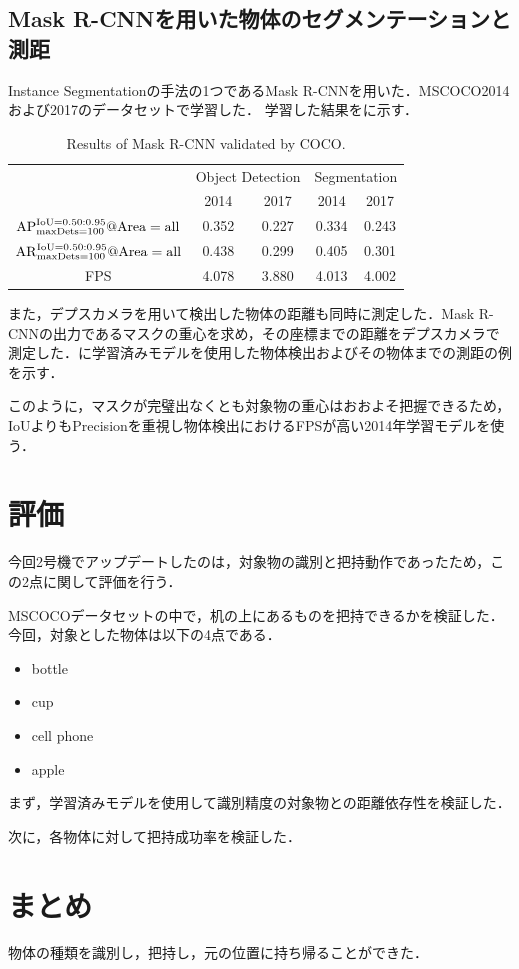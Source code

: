 \subsection{Mask R-CNNを用いた物体のセグメンテーションと測距}
Instance Segmentationの手法の1つであるMask R-CNNを用いた．MSCOCO2014および2017のデータセットで学習した．
学習した結果をに示す．

\begin{table}[H]
    \centering
    \caption{Results of Mask R-CNN validated by COCO.}
    \begin{tabular}{ccccc}\toprule
        & \multicolumn{2}{c}{Object Detection} & \multicolumn{2}{c}{Segmentation} \\ 
         & 2014 & 2017 & 2014 & 2017 \\ \midrule
        $\rm{AP}^{\rm{IoU}=0.50:0.95} _{\rm maxDets=100} @Area=all$ & 0.352 & 0.227 & 0.334 & 0.243 \\ 
        $\rm{AR}^{\rm{IoU}=0.50:0.95} _{\rm maxDets=100} @Area=all$ & 0.438 & 0.299 & 0.405 & 0.301 \\ 
        FPS & 4.078 & 3.880 & 4.013 & 4.002 \\ \bottomrule
    \end{tabular} 
    \label{tab:MSCOCO評価}
\end{table}

また，デプスカメラを用いて検出した物体の距離も同時に測定した．Mask R-CNNの出力であるマスクの重心を求め，その座標までの距離をデプスカメラで測定した．に学習済みモデルを使用した物体検出およびその物体までの測距の例を示す．



このように，マスクが完璧出なくとも対象物の重心はおおよそ把握できるため，IoUよりもPrecisionを重視し物体検出におけるFPSが高い2014年学習モデルを使う．


\section{評価}
今回2号機でアップデートしたのは，対象物の識別と把持動作であったため，この2点に関して評価を行う．

MSCOCOデータセットの中で，机の上にあるものを把持できるかを検証した．
今回，対象とした物体は以下の4点である．
\begin{itemize}
    \item bottle
    \item cup
    \item cell phone
    \item apple
\end{itemize}

まず，学習済みモデルを使用して識別精度の対象物との距離依存性を検証した．


次に，各物体に対して把持成功率を検証した．


\section{まとめ}
物体の種類を識別し，把持し，元の位置に持ち帰ることができた．



